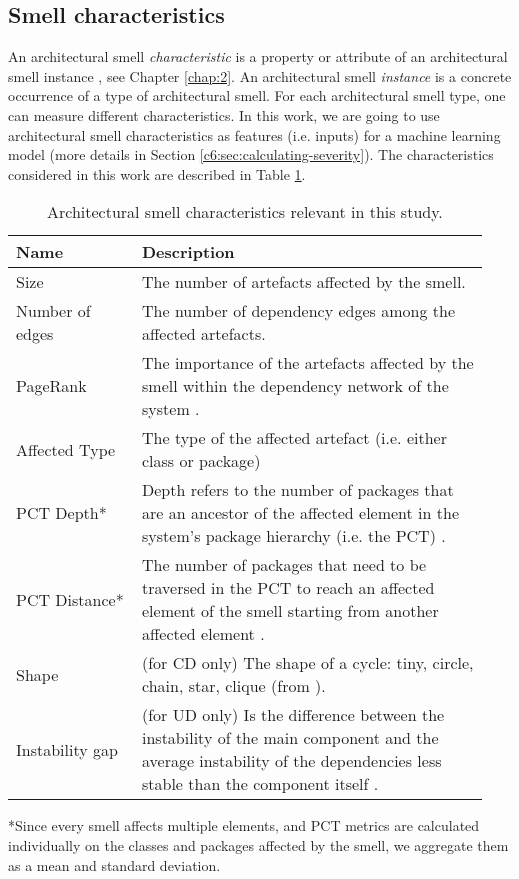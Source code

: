 \subsection{Smell characteristics}
An architectural smell \emph{characteristic} is a property or attribute of an architectural smell instance , see Chapter \ref{chap:2}. 
An architectural smell \emph{instance} is a concrete occurrence of a type of architectural smell.
For each architectural smell type, one can measure different characteristics.
In this work, we are going to use architectural smell characteristics as features (i.e. inputs) for a machine learning model (more details in Section \ref{c6:sec:calculating-severity}).
The characteristics considered in this work are described in Table \ref{c6:tab:characteristics}.

\begin{table}[tbp]
    \footnotesize
    \centering
    \caption{Architectural smell characteristics relevant in this study.}\label{c6:tab:characteristics}
    \begin{tabular}{p{0.25\linewidth}|p{0.69\linewidth}}\toprule
        \textbf{Name} & \textbf{Description} \\ \midrule
        Size & The number of artefacts affected by the smell. \\
        Number of edges & The number of dependency edges among the affected artefacts. \\ 
        PageRank & The importance of the artefacts affected by the smell within the dependency network of the system \cite{Roveda2018}. \\
        Affected Type & The type of the affected artefact (i.e. either class or package) \\
        PCT Depth* & Depth refers to the number of packages that are an ancestor of the affected element in the system's package hierarchy (i.e. the PCT) \cite{Laval2012}. \\
        PCT Distance* & The number of packages that need to be traversed in the PCT to reach an affected element of the smell starting from another affected element \cite{Laval2012,AlMutawa2014}.\\
        Shape & (for CD only) The shape of a cycle: tiny, circle, chain, star, clique (from \cite{AlMutawa2014}). \\
        Instability gap & (for UD only) Is the difference between the instability of the main component and the average instability of the dependencies less stable than the component itself \cite{Arcelli2016}. \\\midrule
    \end{tabular}
    \scriptsize{*Since every smell affects multiple elements, and PCT metrics are calculated individually on the classes and packages affected by the smell, we aggregate them as a mean and standard deviation.}
\end{table}

